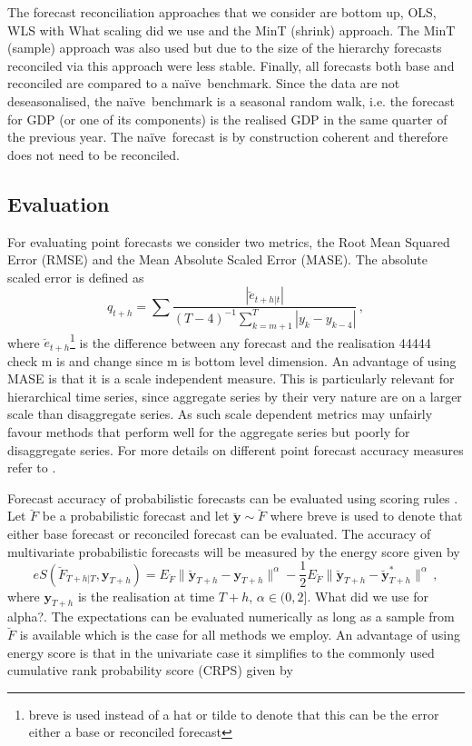 \documentclass[graybox]{svmult}
\def\naive{na\"{i}ve\ }
\begin{document}
The forecast reconciliation approaches that we consider are bottom up, OLS, WLS with {\color{red} What scaling did we use} and the MinT (shrink) approach.  The MinT (sample) approach was also used but due to the size of the hierarchy forecasts reconciled via this approach were less stable.  Finally, all forecasts both base and reconciled are compared to a \naive benchmark.  Since the data are not deseasonalised, the \naive benchmark is a seasonal random walk, i.e. the forecast for GDP (or one of its components) is the realised GDP in the same quarter of the previous year.  The \naive forecast is by construction coherent and therefore does not need to be reconciled.

\subsection{Evaluation}

For evaluating point forecasts we consider two metrics, the Root Mean Squared Error (RMSE) and the Mean Absolute Scaled Error (MASE).  The absolute scaled error is defined as
\begin{equation*}
q_{t+h} = \sum \frac{|\breve{e}_{t+h|t}|}{(T-4)^{-1}\sum_{k=m+1}^{T}|y_k - y_{k-4}|}\,,
\end{equation*}
where $\breve{e}_{t+h}$\footnote{breve is used instead of a hat or tilde to denote that this can be the error either a base or reconciled forecast} is the difference between any forecast and the realisation {\color{red} 44444 check m is and change since m is bottom level dimension}.  An advantage of using MASE is that it is a scale independent measure. This is particularly relevant for hierarchical time series, since aggregate series by their very nature are on a larger scale than disaggregate series.  As such scale dependent metrics may unfairly favour methods that perform well for the aggregate series but poorly for disaggregate series.  For more details on different point forecast accuracy measures refer to \cite{hyndman2018forecasting}.

Forecast accuracy of probabilistic forecasts can be evaluated using scoring rules \cite{Gneiting2014}.  Let $\breve{F}$ be a probabilistic forecast and let $\breve{\bm{y}}\sim \breve{F}$  where breve is used to denote that either base forecast or reconciled forecast can be evaluated.  The accuracy of multivariate probabilistic forecasts will be measured by the energy score given by
\begin{equation*}
eS(\breve{F}_{T+h|T},\bm{y}_{T+h}) =
E_{\breve{F}}\|\breve{\bm{y}}_{T+h}-\bm{y}_{T+h}\|^\alpha
-\frac{1}{2}E_{\breve{F}}\|\breve{\bm{y}}_{T+h}-\breve{\bm{y}}^*_{T+h}\|^\alpha\,,
\end{equation*} where $\bm{y}_{T+h}$ is the realisation at time $T+h$, $\alpha\in (0,2]$. {\color{red} What did we use for alpha?}.  The expectations can be evaluated numerically as long as a sample from $\breve{F}$ is available which is the case for all methods we employ.  An advantage of using energy score is that in the univariate case it simplifies to the commonly used cumulative rank probability score (CRPS) given by
\end{document}
